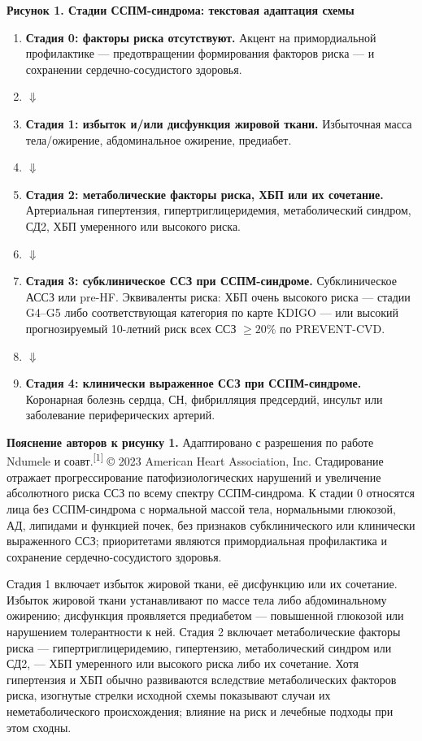 \documentclass[11pt,a4paper]{article}
\newcommand{\src}[1]{\textsuperscript{[#1]}}
\newcommand{\heading}[1]{\par\medskip\textbf{#1}\par}
\begin{document}
\heading{Рисунок 1. Стадии ССПМ-синдрома: текстовая адаптация схемы}
\begin{enumerate}[label={},leftmargin=0pt,labelwidth=0pt,labelsep=0pt]
\item \textbf{Стадия 0: факторы риска отсутствуют.} Акцент на примордиальной профилактике --- предотвращении формирования факторов риска --- и сохранении сердечно-сосудистого здоровья.
\item \hfill $\Downarrow$ \hfill\mbox{}
\item \textbf{Стадия 1: избыток и/или дисфункция жировой ткани.} Избыточная масса тела/ожирение, абдоминальное ожирение, предиабет.
\item \hfill $\Downarrow$ \hfill\mbox{}
\item \textbf{Стадия 2: метаболические факторы риска, ХБП или их сочетание.} Артериальная гипертензия, гипертриглицеридемия, метаболический синдром, СД2, ХБП умеренного или высокого риска.
\item \hfill $\Downarrow$ \hfill\mbox{}
\item \textbf{Стадия 3: субклиническое ССЗ при ССПМ-синдроме.} Субклиническое АССЗ или pre-HF. Эквиваленты риска: ХБП очень высокого риска --- стадии G4--G5 либо соответствующая категория по карте KDIGO --- или высокий прогнозируемый 10-летний риск всех ССЗ $\geq20\%$ по PREVENT-CVD.
\item \hfill $\Downarrow$ \hfill\mbox{}
\item \textbf{Стадия 4: клинически выраженное ССЗ при ССПМ-синдроме.} Коронарная болезнь сердца, СН, фибрилляция предсердий, инсульт или заболевание периферических артерий.
\end{enumerate}

\textbf{Пояснение авторов к рисунку 1.} Адаптировано с разрешения по работе Ndumele и соавт.\src{1} © 2023 American Heart Association, Inc. Стадирование отражает прогрессирование патофизиологических нарушений и увеличение абсолютного риска ССЗ по всему спектру ССПМ-синдрома. К стадии 0 относятся лица без ССПМ-синдрома с нормальной массой тела, нормальными глюкозой, АД, липидами и функцией почек, без признаков субклинического или клинически выраженного ССЗ; приоритетами являются примордиальная профилактика и сохранение сердечно-сосудистого здоровья.

Стадия 1 включает избыток жировой ткани, её дисфункцию или их сочетание. Избыток жировой ткани устанавливают по массе тела либо абдоминальному ожирению; дисфункция проявляется предиабетом --- повышенной глюкозой или нарушением толерантности к ней. Стадия 2 включает метаболические факторы риска --- гипертриглицеридемию, гипертензию, метаболический синдром или СД2, --- ХБП умеренного или высокого риска либо их сочетание. Хотя гипертензия и ХБП обычно развиваются вследствие метаболических факторов риска, изогнутые стрелки исходной схемы показывают случаи их неметаболического происхождения; влияние на риск и лечебные подходы при этом сходны.
\end{document}
